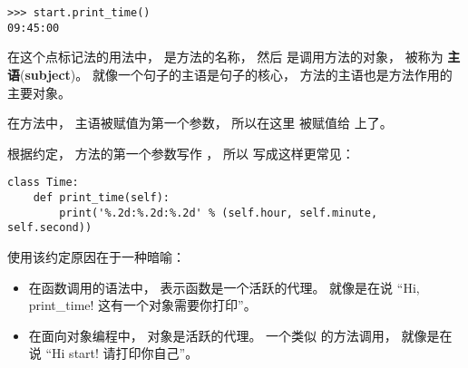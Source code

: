 \begin{lstlisting}
>>> start.print_time()
09:45:00
\end{lstlisting}

在这个点标记法的用法中，  是方法的名称，
然后  是调用方法的对象， 被称为 {\bf 主语}({\bf subject})。
就像一个句子的主语是句子的核心， 方法的主语也是方法作用的主要对象。

在方法中， 主语被赋值为第一个参数， 所以在这里  被赋值给  上了。
  


根据约定， 方法的第一个参数写作  ， 所以  写成这样更常见：

\begin{lstlisting}
class Time:
    def print_time(self):
        print('%.2d:%.2d:%.2d' % (self.hour, self.minute, self.second))
\end{lstlisting}

%
使用该约定原因在于一种暗喻：


\begin{itemize}

\item 在函数调用的语法中，  表示函数是一个活跃的代理。
就像是在说 ``Hi, print\_time! 这有一个对象需要你打印''。

\item 在面向对象编程中， 对象是活跃的代理。    一个类似  的方法调用， 就像是在说 ``Hi start! 请打印你自己''。

\end{itemize}

